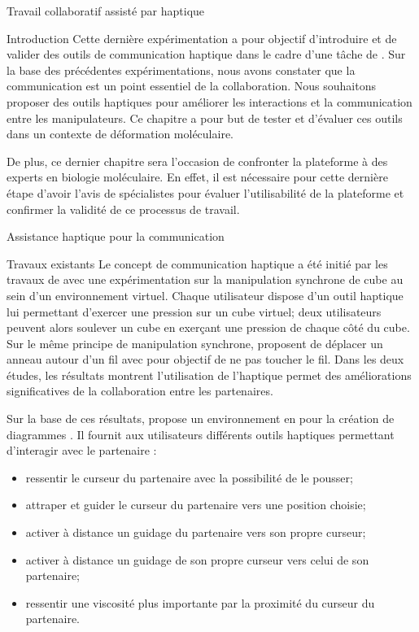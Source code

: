 \documentclass[myfrancais,ngerman,english,frenchb]{mythesis}
\begin{document}
	\begin{mychapter}{Travail collaboratif assisté par haptique}
		\begin{mysection}{Introduction}
			Cette dernière expérimentation a pour objectif d'introduire et de valider des outils de communication haptique dans le cadre d'une tâche de .
			Sur la base des précédentes expérimentations, nous avons constater que la communication est un point essentiel de la collaboration.
			Nous souhaitons proposer des outils haptiques pour améliorer les interactions et la communication entre les manipulateurs.
			Ce chapitre a pour but de tester et d'évaluer ces outils dans un contexte de déformation moléculaire.

			De plus, ce dernier chapitre sera l'occasion de confronter la plateforme \myShaddock à des experts en biologie moléculaire.
			En effet, il est nécessaire pour cette dernière étape d'avoir l'avis de spécialistes pour évaluer l'utilisabilité de la plateforme et confirmer la validité de ce processus de travail.
		\end{mysection}
		\begin{mysection}{Assistance haptique pour la communication}
			\begin{mysubsection}{Travaux existants}
				Le concept de communication haptique a été initié par les travaux de  avec une expérimentation sur la manipulation synchrone de cube au sein d'un environnement virtuel.
				Chaque utilisateur dispose d'un outil haptique lui permettant d'exercer une pression sur un cube virtuel; deux utilisateurs peuvent alors soulever un cube en exerçant une pression de chaque côté du cube.
				Sur le même principe de manipulation synchrone,  proposent de déplacer un anneau autour d'un fil avec pour objectif de ne pas toucher le fil.
				Dans les deux études, les résultats montrent l'utilisation de l'haptique permet des améliorations significatives de la collaboration entre les partenaires.

				Sur la base de ces résultats,  propose un environnement en \myTwoD pour la création de diagrammes .
				Il fournit aux utilisateurs différents outils haptiques permettant d'interagir avec le partenaire :
				\begin{itemize}
					\item ressentir le curseur du partenaire avec la possibilité de le pousser;
					\item attraper et guider le curseur du partenaire vers une position choisie;
					\item activer à distance un guidage du partenaire vers son propre curseur;
					\item activer à distance un guidage de son propre curseur vers celui de son partenaire;
					\item ressentir une viscosité plus importante par la proximité du curseur du partenaire.
				\end{itemize}


\end{mysubsection}
\end{mysection}
\end{mychapter}
\end{document}
